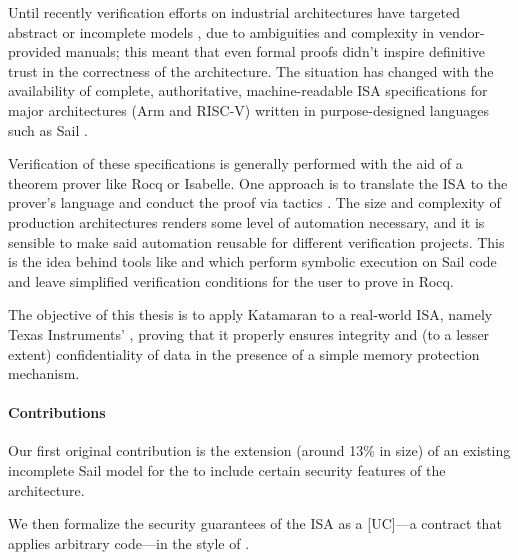 Until recently verification efforts on industrial architectures have targeted abstract or incomplete models \cite{Georges2021}\cite{Jensen2013}\cite{Guanciale2016}, due to ambiguities and complexity in vendor-provided manuals; this meant that even formal proofs didn't inspire definitive trust in the correctness of the architecture. The situation has changed with the availability of complete, authoritative, machine-readable ISA specifications \cite{Armstrong2019} for major architectures (Arm and RISC-V) written in purpose-designed languages such as Sail \cite{Armstrong}.

Verification of these specifications is generally performed with the aid of a theorem prover like Rocq or Isabelle. One approach is to translate the ISA to the prover's language and conduct the proof via tactics \cite{Armstrong2019}\cite{Bauereiss2022}. The size and complexity of production architectures renders some level of automation necessary, and it is sensible to make said automation reusable for different verification projects. This is the idea behind tools like  \cite{Sammler2022} and  \cite{Huyghebaert2023} which perform symbolic execution on Sail code and leave simplified verification conditions for the user to prove in Rocq.



The objective of this thesis is to apply Katamaran to a real-world ISA, namely Texas Instruments' \msp, proving that it properly ensures integrity and (to a lesser extent) confidentiality of data in the presence of a simple memory protection mechanism.

\paragraph{Contributions}

Our first original contribution is the extension (around 13\% in size) of an existing incomplete Sail model for the \msp \cite{mspthesis} to include certain security features of the architecture.

We then formalize the security guarantees of the ISA as a [UC]---a contract that applies arbitrary code---in the style of \cite{Huyghebaert2023}.

